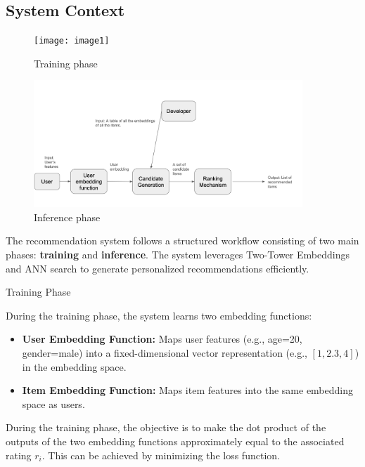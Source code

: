 \documentclass[12pt]{article}
\begin{document}
\subsection{System Context}

\begin{figure}[h!]
\begin{center}
 \texttt{[image: image1]}
\caption{Training phase}
\label{Fig_SystemContext1} 
\end{center}

\end{figure}
\begin{figure}[h!]
  \begin{center}
   \includegraphics[width=0.9\textwidth]{image2}
  \caption{Inference phase}
  \label{Fig_SystemContext2} 
  \end{center}
  \end{figure}
The recommendation system follows a structured workflow consisting of two main phases: \textbf{training} and \textbf{inference}. The system leverages Two-Tower Embeddings and ANN search to generate personalized recommendations efficiently.

Training Phase

During the training phase, the system learns two embedding functions:

\begin{itemize}
    \item \textbf{User Embedding Function:} Maps user features (e.g., age=20, gender=male) into a fixed-dimensional vector representation (e.g., $[1,2.3,4]$) in the embedding space.
    \item \textbf{Item Embedding Function:} Maps item features into the same embedding space as users.
\end{itemize}
During the training phase, the objective is to make the dot product of the outputs of the two embedding functions approximately equal to the associated rating $r_i$. This can be achieved by minimizing the loss function.
\end{document}
